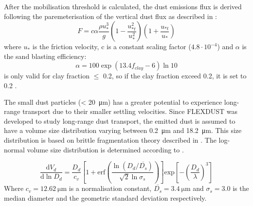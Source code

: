 After the mobilisation threshold is calculated,  the dust emissions flux is derived following the paremeterisation of the vertical dust flux as described in \textcite{MB95_dust_emission}: 
\begin{equation}
    F=c\alpha \frac{\rho u_{*}^3}{g}\left(1-\frac{u^2_{*t}}{u^2_*}\right)\left(1+ \frac{u_{*t}}{u_*}\right)
\end{equation}
where $u_*$ is the friction velocity, c is a constant scaling factor ($4.8\cdot 10^{-4}$) and $\alpha$ is the sand blasting efficiency:
\begin{equation}\label{eq:sand_blasing_eff}
    \alpha = 100\exp{(13.4f_{clay}-6)\ln 10}
\end{equation}
 is only valid for clay fraction $\leq$ 0.2, so if the clay fraction exceed 0.2, it is set to 0.2 \parencite{zender2003mineral}. 


The small dust particles (< \SI{20}{\micro\metre}) has a greater potential to experience long-range transport due to their smaller settling velocities. Since FLEXDUST was developed to study long-range dust transport, the emitted dust is assumed to have a volume size distribution varying between \SI{0.2}{\micro\metre} and \SI{18.2}{\micro\metre}. This size distribution is based on brittle fragmentation theory described in \textcite{kok_scaling_2011}. The log-normal volume size distribution is determined according to . 

\begin{equation}\label{eq:size_dist}
    \frac{\text{d} V_d}{\text{d} \ln D_d} = \frac{D_d}{c_v}\left[1 + \text{erf}\left(\frac{\ln(D_d/\overline{D_s})}{\sqrt{2}\ln \sigma_s}\right)\right]\text{exp}\left[-\left(\frac{D_d}{\lambda}\right)^3\right]
\end{equation}
Where $c_v = \SI{12.62}{\micro\metre}$ is a normalisation constant, $\overline{D_s}=\SI{3.4}{\micro\metre}$ and $\sigma_s = 3.0$ is the median diameter and the geometric standard deviation respectively.  

